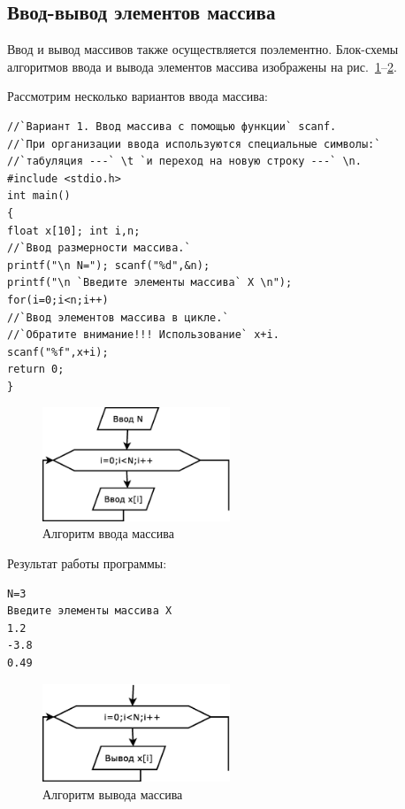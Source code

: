 \subsection[Ввод-вывод элементов массива]{Ввод-вывод элементов массива}
Ввод и вывод массивов также осуществляется поэлементно. Блок-схемы алгоритмов ввода и вывода элементов массива
 изображены на рис.~\ref{ch05:refDrawing1}--\ref{ch05:refDrawing2}.

Рассмотрим несколько вариантов ввода массива:
\begin{lstlisting}
//`Вариант 1. Ввод массива с помощью функции` scanf.
//`При организации ввода используются специальные символы:`
//`табуляция ---` \t `и переход на новую строку ---` \n.
#include <stdio.h>
int main()
{
float x[10]; int i,n; 
//`Ввод размерности массива.`
printf("\n N="); scanf("%d",&n);
printf("\n `Введите элементы массива` X \n"); 
for(i=0;i<n;i++)
//`Ввод элементов массива в цикле.`
//`Обратите внимание!!! Использование` x+i.
scanf("%f",x+i);
return 0;
}
\end{lstlisting}

\begin{figure}[htb]
\begin{center}
\includegraphics[width=0.5\textwidth]{img/ris_5_2}
\caption{Алгоритм ввода массива }
\label{ch05:refDrawing1}
\end{center}
\end{figure}

Результат работы программы:
\begin{verbatim}
N=3
Введите элементы массива X 
1.2
-3.8
0.49
\end{verbatim}
\begin{figure}[htb]
\begin{center}
\includegraphics[width=0.5\textwidth]{img/ris_5_3}
\caption{Алгоритм вывода массива }
\label{ch05:refDrawing2}
\end{center}
\end{figure}


